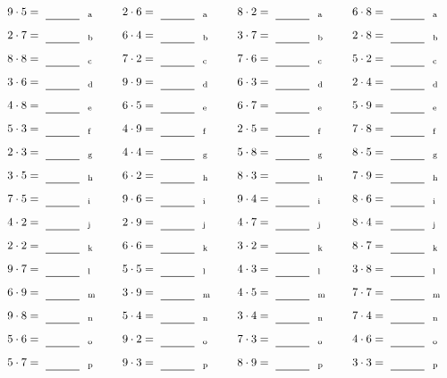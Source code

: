 \documentclass
[
  draft    = true,
  fontsize = 11pt,
  parskip  = half-
]
{scrartcl}
\begin{document}
\par\vfill\par
\begin{align*}
    \pline{9\cdot5}&=\rline{a}
  & \pline{2\cdot6}&=\rline{a}
  & \pline{8\cdot2}&=\rline{a}
  & \pline{6\cdot8}&=\rline{a} \\[1ex]
    \pline{2\cdot7}&=\rline{b}
  & \pline{6\cdot4}&=\rline{b}
  & \pline{3\cdot7}&=\rline{b}
  & \pline{2\cdot8}&=\rline{b} \\[1ex]
    \pline{8\cdot8}&=\rline{c}
  & \pline{7\cdot2}&=\rline{c}
  & \pline{7\cdot6}&=\rline{c}
  & \pline{5\cdot2}&=\rline{c} \\[1ex]
    \pline{3\cdot6}&=\rline{d}
  & \pline{9\cdot9}&=\rline{d}
  & \pline{6\cdot3}&=\rline{d}
  & \pline{2\cdot4}&=\rline{d} \\[1ex]
    \pline{4\cdot8}&=\rline{e}
  & \pline{6\cdot5}&=\rline{e}
  & \pline{6\cdot7}&=\rline{e}
  & \pline{5\cdot9}&=\rline{e} \\[1ex]
    \pline{5\cdot3}&=\rline{f}
  & \pline{4\cdot9}&=\rline{f}
  & \pline{2\cdot5}&=\rline{f}
  & \pline{7\cdot8}&=\rline{f} \\[1ex]
    \pline{2\cdot3}&=\rline{g}
  & \pline{4\cdot4}&=\rline{g}
  & \pline{5\cdot8}&=\rline{g}
  & \pline{8\cdot5}&=\rline{g} \\[1ex]
    \pline{3\cdot5}&=\rline{h}
  & \pline{6\cdot2}&=\rline{h}
  & \pline{8\cdot3}&=\rline{h}
  & \pline{7\cdot9}&=\rline{h} \\[1ex]
    \pline{7\cdot5}&=\rline{i}
  & \pline{9\cdot6}&=\rline{i}
  & \pline{9\cdot4}&=\rline{i}
  & \pline{8\cdot6}&=\rline{i} \\[1ex]
    \pline{4\cdot2}&=\rline{j}
  & \pline{2\cdot9}&=\rline{j}
  & \pline{4\cdot7}&=\rline{j}
  & \pline{8\cdot4}&=\rline{j} \\[1ex]
    \pline{2\cdot2}&=\rline{k}
  & \pline{6\cdot6}&=\rline{k}
  & \pline{3\cdot2}&=\rline{k}
  & \pline{8\cdot7}&=\rline{k} \\[1ex]
    \pline{9\cdot7}&=\rline{l}
  & \pline{5\cdot5}&=\rline{l}
  & \pline{4\cdot3}&=\rline{l}
  & \pline{3\cdot8}&=\rline{l} \\[1ex]
    \pline{6\cdot9}&=\rline{m}
  & \pline{3\cdot9}&=\rline{m}
  & \pline{4\cdot5}&=\rline{m}
  & \pline{7\cdot7}&=\rline{m} \\[1ex]
    \pline{9\cdot8}&=\rline{n}
  & \pline{5\cdot4}&=\rline{n}
  & \pline{3\cdot4}&=\rline{n}
  & \pline{7\cdot4}&=\rline{n} \\[1ex]
    \pline{5\cdot6}&=\rline{o}
  & \pline{9\cdot2}&=\rline{o}
  & \pline{7\cdot3}&=\rline{o}
  & \pline{4\cdot6}&=\rline{o} \\[1ex]
    \pline{5\cdot7}&=\rline{p}
  & \pline{9\cdot3}&=\rline{p}
  & \pline{8\cdot9}&=\rline{p}
  & \pline{3\cdot3}&=\rline{p}
\end{align*}
\end{document}
